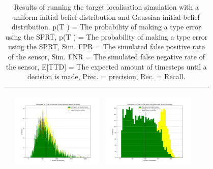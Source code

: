 \begin{landscape}
\begin{table}[h!]
\begin{tabular}{ | c | c | c | c | c |}
\begin{minipage}[c][45mm][c]{45mm}
    \end{minipage}
    &
    \begin{minipage}[c][45mm][c]{45mm}
      \includegraphics[width=44mm, height=44mm]{Chapters/MultiAgentTargetDetection/Figs/Histograms/VaryingPrior/Uniform/UniformRandomHistogram.png}
    \end{minipage}
    &
    \begin{minipage}[c][45mm][c]{45mm}
      \includegraphics[width=44mm, height=44mm]{Chapters/MultiAgentTargetDetection/Figs/Histograms/VaryingPrior/Uniform/UniformSaccadicHistogram.png}
    \end{minipage}
    \\
    \hline
   
  \end{tabular}
  \caption{Results of running the target localisation simulation with a  uniform initial belief distribution and Gaussian initial belief distribution. p(T ) = The probability of making a type  error using the SPRT, p(T ) = The probability of making a type  error using the SPRT, Sim. FPR = The simulated false positive rate of the sensor, Sim. FNR = The simulated false negative rate of the sensor, E[TTD] = The expected amount of timesteps until a decision is made, Prec. = precision, Rec. = Recall. }\label{table:ORToolsResults}
\end{table}




\end{landscape}
